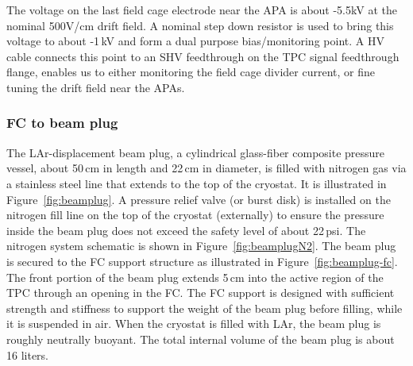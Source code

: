 The voltage on the last field cage electrode near the APA is about -5.5kV at the nominal 500V/cm drift field. A nominal step down resistor is used to bring this voltage to about -1\,kV and form a dual purpose bias/monitoring point.  A HV cable connects this point to an SHV feedthrough on the TPC signal feedthrough flange, enables us to either monitoring the field cage divider current, or fine tuning the drift field near the APAs.  

\subsubsection{FC to beam plug}
\label{subsec:fc-beamplug}




The LAr-displacement beam plug, a cylindrical glass-fiber composite pressure vessel, about 50\,cm in length and 22\,cm in diameter, is filled with nitrogen gas via a stainless steel line that extends to the top of the cryostat. It is illustrated in Figure~\ref{fig:beamplug}.
A pressure relief valve (or burst disk) is installed on the nitrogen fill line on the top of the cryostat (externally) to ensure the pressure inside the beam plug does not exceed the safety level of about 22\,psi. The nitrogen system schematic is shown in Figure~\ref{fig:beamplugN2}. 
The beam plug is secured to the FC support structure as illustrated in Figure~\ref{fig:beamplug-fc}. The front portion of the beam plug extends  5\,cm into the active region of the TPC  through an opening in the FC. The FC support is designed with sufficient strength and stiffness to support the weight of the beam plug before filling, while it is suspended in air.  When the cryostat is filled with LAr, the beam plug is roughly neutrally buoyant.  The total internal volume of the beam plug is about 16 liters. 

